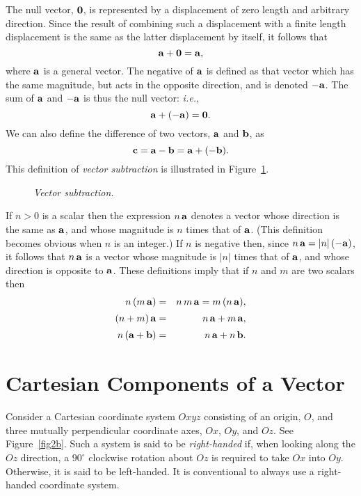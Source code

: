The null vector, ${\bf 0}$, is represented by a displacement of zero length and arbitrary direction. 
Since the result of combining such a displacement with a  finite length displacement is the same
as the latter displacement by itself, it follows that
\begin{equation}
{\bf a} + {\bf 0} = {\bf a},
\end{equation}
where ${\bf a}$ is a general vector. 
The negative of ${\bf a}$ is defined as that vector which has the same magnitude, but  acts in the opposite direction, and is denoted $-{\bf a}$.
The sum of ${\bf a}$ and  $-{\bf a}$ is  thus
the null vector: {\em i.e.},
\begin{equation}
{\bf a} + (-{\bf a}) = {\bf 0}.
\end{equation}
We can also define the difference of two vectors, ${\bf a}$ and ${\bf b}$, as
\begin{equation}
{\bf c} = {\bf a} - {\bf b} = {\bf a} +(-{\bf b}).
\end{equation}
This definition of {\em vector subtraction}\/ is illustrated in Figure~\ref{fig2a}. 

\begin{figure}
\epsfysize=1.75in
\centerline{}
\caption{\em Vector subtraction.}\label{fig2a}
\end{figure}

If $n>0$ is a scalar then the expression $n\,{\bf a}$ denotes a vector whose direction is the same
as ${\bf a}$, and whose magnitude
is $n$ times that of ${\bf a}$. (This definition becomes obvious when $n$ is an integer.)
If $n$ is negative then, since $n\,{\bf a} = |n|\,(-{\bf a})$, it follows
that $n\,{\bf a}$ is a vector whose magnitude is $|n|$ times that of ${\bf a}$, and whose
direction is opposite to ${\bf a}$. These definitions imply that if $n$ and $m$ are
two scalars then
\begin{eqnarray}
n\,(m\,{\bf a}) &=& n\,m\,{\bf a} = m\,(n\,{\bf a}),\\[0.5ex]
(n+m)\,{\bf a} &=& n\,{\bf a} + m\,{\bf a},\\[0.5ex]
n\,({\bf a} + {\bf b}) &=& n\,{\bf a} + n\,{\bf b}.
\end{eqnarray}

\section{Cartesian Components of a Vector}
Consider a Cartesian coordinate system $Oxyz$ consisting of
an origin, $O$, and three mutually perpendicular coordinate axes, $Ox$, $Oy$, and
$Oz$. See Figure~\ref{fig2b}. Such a system is said to be {\em right-handed}\/  if, when looking along the $Oz$ direction, a $90^\circ$ clockwise
rotation about $Oz$  is required to take $Ox$ into $Oy$. Otherwise, it is said to be left-handed. It is conventional to always use  a right-handed coordinate system. 

